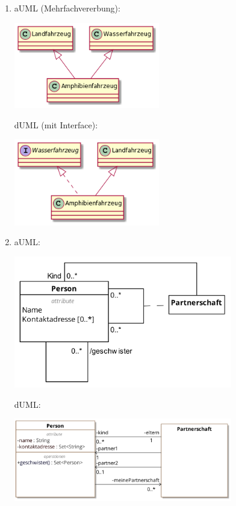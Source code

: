\documentclass{article}
\begin{document}
\begin{enumerate}[label=(\alph*)]
\begin{center}
		\end{center}
		\item aUML (Mehrfachvererbung):
		\begin{center}
			\includegraphics[width=0.5\textwidth]{./Aufgabe13_2e1}
		\end{center}
		dUML (mit Interface):
		\begin{center}
			\includegraphics[width=0.5\textwidth]{./Aufgabe13_2e2}
		\end{center}
		\item aUML:
		\begin{center}
			\includegraphics[width=0.75\textwidth]{./Aufgabe13_2f1}
		\end{center}
		dUML:
		\begin{center}
			\includegraphics[width=0.75\textwidth]{./Aufgabe13_2f2}
		\end{center}
	\end{enumerate}
	
\end{document}
